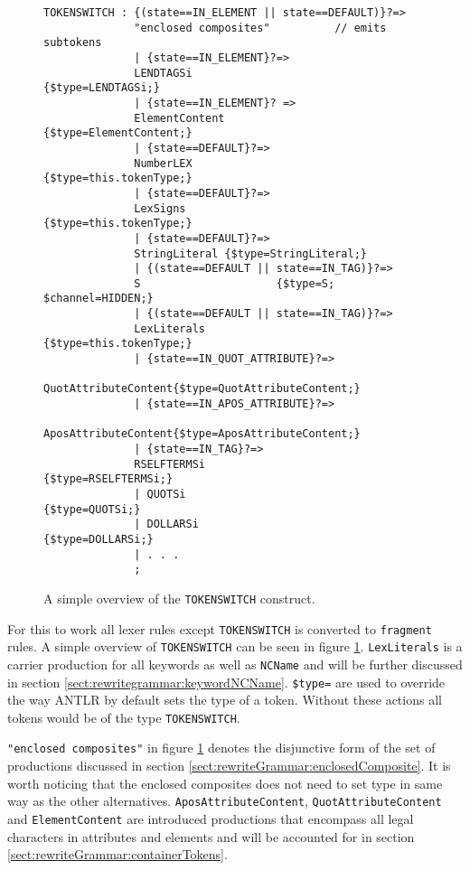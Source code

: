\begin{figure}[h!]
\begin{verbatim}
TOKENSWITCH : {(state==IN_ELEMENT || state==DEFAULT)}?=>
              "enclosed composites"          // emits subtokens
              | {state==IN_ELEMENT}?=>
              LENDTAGSi                      {$type=LENDTAGSi;}
              | {state==IN_ELEMENT}? =>
              ElementContent            {$type=ElementContent;} 
              | {state==DEFAULT}?=>
              NumberLEX	                {$type=this.tokenType;}
              | {state==DEFAULT}?=>
              LexSigns                  {$type=this.tokenType;}
              | {state==DEFAULT}?=>
              StringLiteral {$type=StringLiteral;}
              | {(state==DEFAULT || state==IN_TAG)}?=>
              S                     {$type=S; $channel=HIDDEN;}
              | {(state==DEFAULT || state==IN_TAG)}?=>
              LexLiterals               {$type=this.tokenType;} 
              | {state==IN_QUOT_ATTRIBUTE}?=>
              QuotAttributeContent{$type=QuotAttributeContent;}
              | {state==IN_APOS_ATTRIBUTE}?=>
              AposAttributeContent{$type=AposAttributeContent;}
              | {state==IN_TAG}?=>
              RSELFTERMSi                  {$type=RSELFTERMSi;}
              | QUOTSi                          {$type=QUOTSi;}
              | DOLLARSi                      {$type=DOLLARSi;}
              | . . .
              ;

\end{verbatim}
\caption[Overview of the \texttt{TOKENSWITCH} construct]{A simple overview of the \texttt{TOKENSWITCH} construct.}
\label{fig:tokenswitch}
\end{figure}

For this to work all lexer rules except \verb!TOKENSWITCH! is converted to \verb!fragment! rules. A simple overview of \verb!TOKENSWITCH! can be seen in figure \ref{fig:tokenswitch}. \verb!LexLiterals! is a carrier production for all keywords as well as \verb!NCName! and will be further discussed in section \ref{sect:rewritegrammar:keywordNCName}. \verb!$type=! are used to override the way ANTLR by default sets the type of a token. Without these actions all tokens would be of the type \verb!TOKENSWITCH!.

\verb!"enclosed composites"! in figure \ref{fig:tokenswitch} denotes the disjunctive form of the set of productions discussed in section \ref{sect:rewriteGrammar:enclosedComposite}. It is worth noticing that the enclosed composites does not need to set type in same way as the other alternatives. \verb!AposAttributeContent!, \verb!QuotAttributeContent! and \verb!ElementContent! are introduced productions that encompass all legal characters in attributes and elements and will be accounted for in section \ref{sect:rewriteGrammar:containerTokens}.

